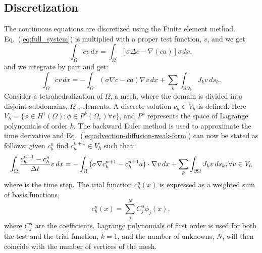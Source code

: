 \subsection{Discretization}
\label{sec:discretization}
The continuous equations are discretized using the Finite element method. Eq.~(\ref{eq:full_system}) is multiplied with a proper test function, $v$, and we get:
\begin{equation}
  \label{eq:advection-diffusion-weak-form-0}
  \int_\Omega\dot{c}v\,dx = \int_\Omega \left[\sigma\Delta c-\nabla(ca)\right] v\,dx,
\end{equation}
and we integrate by part and get:
\begin{equation}
  \label{eq:advection-diffusion-weak-form}
  \int_\Omega\dot{c}v\,dx = -\int_\Omega \left(\sigma\nabla c-ca\right)\nabla v\,dx + \sum_k\int_{\partial\Omega_k} J_kv\,ds_k.
\end{equation}
Consider a tetrahedralization of $\Omega$, a mesh, where the domain is divided into disjoint subdomains, $\Omega_e$, elements. A discrete solution $c_h\in V_h$ is defined. Here $V_h=\{ \phi \in H^1(\Omega):\phi\in P^k(\Omega_e)\forall e\}$, and $P^k$ represents the space of Lagrange polynomials of order $k$. The backward Euler method is used to approximate the time derivative and Eq.~(\ref{eq:advection-diffusion-weak-form}) can now be stated as follows: given $c_h^n$ find $c_h^{n+1} \in V_h$ such that:
\begin{equation}
  \label{eq:advection-diffusion-weak-discrete-form}
  \int_{\Omega} \frac{c_h^{n+1}-c_h^{n}}{\Delta{}t}v\,dx = -\int_{\Omega} \left(\sigma\nabla c_h^{n+1}-c_h^{n+1}a\right)\cdot\nabla v\,dx + \sum_k\int_{\partial\Omega} J_kv\,ds_{k},\forall v \in V_h
\end{equation}
where \Dt is the time step. The trial function $c^n_h(x)$ is expressed as a weighted sum of basis functions, 
\begin{equation}
  \label{eq:discrete-solution}
  c^n_h(x) = \sum^N_j C_j^n\phi_j(x),
\end{equation}
where $C_j^n$ are the coefficients. Lagrange polynomials of first order is used for both the test and the trial function, $k=1$, and the number of unknowns, $N$, will then coincide with the number of vertices of the mesh.\par

